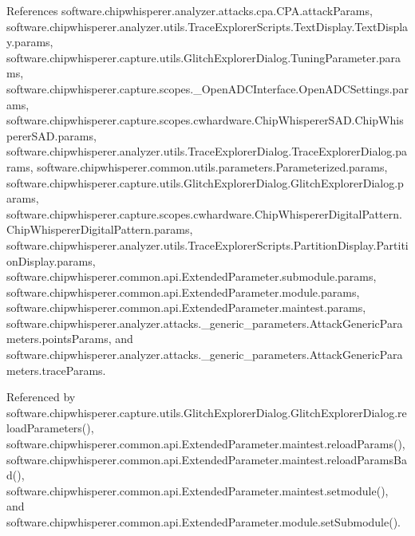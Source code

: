 References software.\+chipwhisperer.\+analyzer.\+attacks.\+cpa.\+C\+P\+A.\+attack\+Params, software.\+chipwhisperer.\+analyzer.\+utils.\+Trace\+Explorer\+Scripts.\+Text\+Display.\+Text\+Display.\+params, software.\+chipwhisperer.\+capture.\+utils.\+Glitch\+Explorer\+Dialog.\+Tuning\+Parameter.\+params, software.\+chipwhisperer.\+capture.\+scopes.\+\_\+\+Open\+A\+D\+C\+Interface.\+Open\+A\+D\+C\+Settings.\+params, software.\+chipwhisperer.\+capture.\+scopes.\+cwhardware.\+Chip\+Whisperer\+S\+A\+D.\+Chip\+Whisperer\+S\+A\+D.\+params, software.\+chipwhisperer.\+analyzer.\+utils.\+Trace\+Explorer\+Dialog.\+Trace\+Explorer\+Dialog.\+params, software.\+chipwhisperer.\+common.\+utils.\+parameters.\+Parameterized.\+params, software.\+chipwhisperer.\+capture.\+utils.\+Glitch\+Explorer\+Dialog.\+Glitch\+Explorer\+Dialog.\+params, software.\+chipwhisperer.\+capture.\+scopes.\+cwhardware.\+Chip\+Whisperer\+Digital\+Pattern.\+Chip\+Whisperer\+Digital\+Pattern.\+params, software.\+chipwhisperer.\+analyzer.\+utils.\+Trace\+Explorer\+Scripts.\+Partition\+Display.\+Partition\+Display.\+params, software.\+chipwhisperer.\+common.\+api.\+Extended\+Parameter.\+submodule.\+params, software.\+chipwhisperer.\+common.\+api.\+Extended\+Parameter.\+module.\+params, software.\+chipwhisperer.\+common.\+api.\+Extended\+Parameter.\+maintest.\+params, software.\+chipwhisperer.\+analyzer.\+attacks.\+\_\+generic\+\_\+parameters.\+Attack\+Generic\+Parameters.\+points\+Params, and software.\+chipwhisperer.\+analyzer.\+attacks.\+\_\+generic\+\_\+parameters.\+Attack\+Generic\+Parameters.\+trace\+Params.



Referenced by software.\+chipwhisperer.\+capture.\+utils.\+Glitch\+Explorer\+Dialog.\+Glitch\+Explorer\+Dialog.\+reload\+Parameters(), software.\+chipwhisperer.\+common.\+api.\+Extended\+Parameter.\+maintest.\+reload\+Params(), software.\+chipwhisperer.\+common.\+api.\+Extended\+Parameter.\+maintest.\+reload\+Params\+Bad(), software.\+chipwhisperer.\+common.\+api.\+Extended\+Parameter.\+maintest.\+setmodule(), and software.\+chipwhisperer.\+common.\+api.\+Extended\+Parameter.\+module.\+set\+Submodule().


